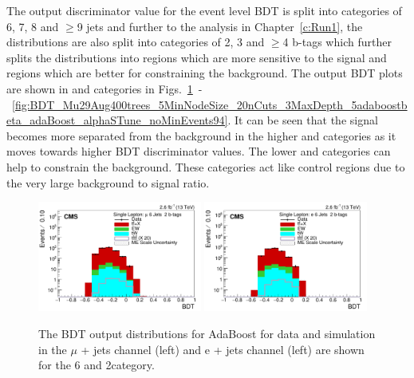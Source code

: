 The output discriminator value for the event level BDT is split into \njets categories of 6, 7, 8 and $\geq$9 jets and further to the \runone analysis in Chapter~\ref{c:Run1}, the distributions are also split into \nMtags categories of 2, 3 and $\geq$4 b-tags which further splits the distributions into regions which are more sensitive to the signal and regions which are better for constraining the background.
The output BDT plots are shown in \njets and \nMtags categories in Figs.~\ref{fig:BDT_Mu29Aug400trees_5MinNodeSize_20nCuts_3MaxDepth_5adaboostbeta_adaBoost_alphaSTune_noMinEvents62}~-~\ref{fig:BDT_Mu29Aug400trees_5MinNodeSize_20nCuts_3MaxDepth_5adaboostbeta_adaBoost_alphaSTune_noMinEvents94}. It can be seen that the signal becomes more separated from the background in the higher \njets and \nMtags categories as it moves towards higher BDT discriminator values. The lower \njets and \nMtags categories can help to constrain the \ttbar background. These categories act like control regions due to the very large background to signal ratio.

\begin{figure}[ht!]
    \includegraphics[width=0.48\textwidth]{images/Run2/BDT_Mu29Aug400trees_5MinNodeSize_20nCuts_3MaxDepth_5adaboostbeta_adaBoost_alphaSTune_noMinEvents6nJets2nMtags_StackLogY.pdf}
    \includegraphics[width=0.48\textwidth]{images/Run2/BDT_El29Aug400trees_5MinNodeSize_20nCuts_3MaxDepth_5adaboostbeta_adaBoost_alphaSTune_noMinEvents6nJets2nMtags_StackLogY.pdf} 
    \caption{The BDT output distributions for AdaBoost for data and simulation in the $\mu$ + jets channel (left) and e + jets channel (left) are shown for the 6 \njets and 2\nMtags category.}
    \label{fig:BDT_Mu29Aug400trees_5MinNodeSize_20nCuts_3MaxDepth_5adaboostbeta_adaBoost_alphaSTune_noMinEvents62}
\end{figure}

